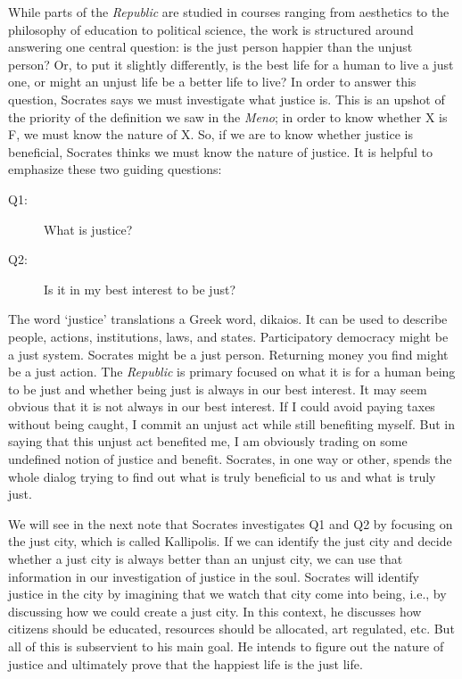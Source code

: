 \documentclass[oneside]{article}
\begin{document}
While parts of the \emph{Republic} are studied in courses ranging from aesthetics to the philosophy of education to political science, the work is structured around answering one central question: is the just person happier than the unjust person? Or, to put it slightly differently, is the best life for a human to live a just one, or might an unjust life be a better life to live? In order to answer this question, Socrates says we must investigate what justice is. This is an upshot of the priority of the definition we saw in the \emph{Meno}; in order to know whether X is F, we must know the nature of X. So, if we are to know whether justice is beneficial, Socrates thinks we must know the nature of justice. It is helpful to emphasize these two guiding questions: 

\begin{description}
\item[Q1:] What is justice? 
\item[Q2:] Is it in my best interest to be just? 
\end{description}
The word `justice' translations a Greek word, dikaios. It can be used to describe people, actions, institutions, laws, and states. Participatory democracy might be a just system. Socrates might be a just person. Returning money you find might be a just action. The \emph{Republic} is primary focused on what it is for a human being to be just and whether being just is always in our best interest. It may seem obvious that it is not always in our best interest. If I could avoid paying taxes without being caught, I commit an unjust act while still benefiting myself. But in saying that this unjust act benefited me, I am obviously trading on some undefined notion of justice and benefit. Socrates, in one way or other, spends the whole dialog trying to find out what is truly beneficial to us and what is truly just. 

 We will see in the next note that Socrates investigates Q1 and Q2 by focusing on the just city, which is called Kallipolis. If we can identify the just city and decide whether a just city is always better than an unjust city, we can use that information in our investigation of justice in the soul. Socrates will identify justice in the city by imagining that we watch that city come into being, i.e., by discussing how we could create a just city. In this context, he discusses how citizens should be educated, resources should be allocated, art regulated, etc. But all of this is subservient to his main goal. He intends to figure out the nature of justice and ultimately prove that the happiest life is the just life. 
\end{document}

